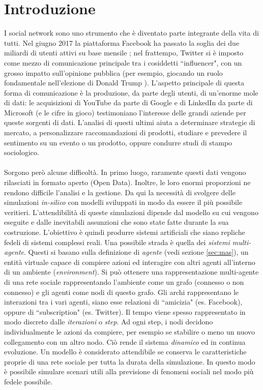 \documentclass[a4paper,12pt]{article}
\begin{document}
\newpage
\tableofcontents
\newpage
\section{Introduzione}
\label{sec:introduction}

I social network sono uno strumento che è diventato parte integrante della vita di tutti. Nel giugno 2017 la piattaforma Facebook ha passato la soglia dei due miliardi di utenti attivi su base mensile \cite{facebook}; nel frattempo, Twitter si è imposto come mezzo di comunicazione principale tra i cosiddetti ``influencer", con un grosso impatto sull'opinione pubblica (per esempio, giocando un ruolo fondamentale nell'elezione di Donald Trump \cite{twitter}). L'aspetto principale di questa forma di comunicazione è la produzione, da parte degli utenti, di un'enorme mole di dati: le acquisizioni di YouTube da parte di Google \cite{youtube} e di LinkedIn da parte di Microsoft \cite{linkedin} (e le cifre in gioco) testimoniano l'interesse delle grandi aziende per queste sorgenti di dati. L'analisi di questi ultimi aiuta a determinare strategie di mercato, a personalizzare raccomandazioni di prodotti, studiare e prevedere il sentimento su un evento o un prodotto, oppure condurre studi di stampo sociologico. 
\\
\\
Sorgono però alcune difficoltà. In primo luogo, raramente questi dati vengono rilasciati in formato aperto (Open Data). Inoltre, le loro enormi proporzioni ne rendono difficile l'analisi e la gestione. Da qui la necessità di svolgere delle simulazioni \textit{in-silico} con modelli sviluppati in modo da essere il più possibile veritieri. L'attendibilità di queste simulazioni dipende dal modello su cui vengono eseguite e dalle inevitabili assunzioni che sono state fatte durante la sua costruzione. L'obiettivo è quindi produrre sistemi artificiali che siano repliche fedeli di sistemi complessi reali. Una possibile strada è quella dei \textit{sistemi multi-agente}. Questi si basano sulla definizione di \textit{agente} (vedi sezione \ref{sec:mas}), un entità virtuale \cite{ferber} capace di compiere azioni ed interagire con altri agenti all'interno di un ambiente (\textit{environment}). Si può ottenere una rappresentazione multi-agente di una rete sociale rappresentando l'ambiente come un grafo (connesso o non connesso) e gli agenti come nodi di questo grafo. Gli archi rappresentano le interazioni tra i vari agenti, siano esse relazioni di ``amicizia" (es. Facebook), oppure di ``subscription" (es. Twitter). Il tempo viene spesso rappresentato in modo discreto dalle \textit{iterazioni} o \textit{step}. Ad ogni step, i nodi decidono individualmente le azioni da compiere, per esempio se stabilire o meno un nuovo collegamento con un altro nodo. Ciò rende il sistema \textit{dinamico} ed in continua evoluzione. Un modello è considerato attendibile se conserva le caratteristiche proprie di una rete sociale per tutta la durata della simulazione. In questo modo è possibile simulare scenari utili alla previsione di fenomeni sociali nel modo più fedele possibile.
\end{document}
